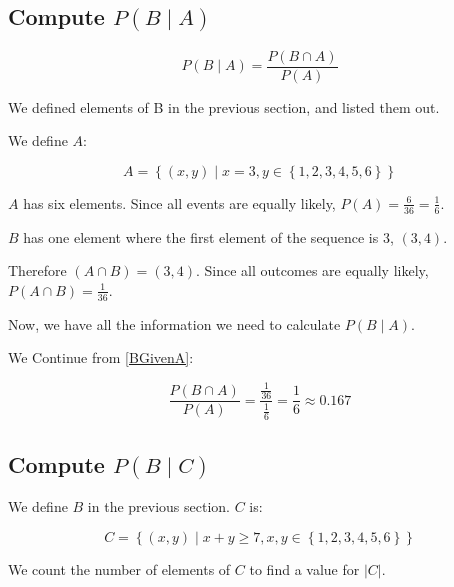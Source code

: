 \documentclass[a4paper,11pt]{article}
\begin{document}
\label{defs}
\subsection{Compute $P \left( B \mid A \right)$} 

\begin{equation}  
  P \left( B \mid A \right) =
  \frac {P \left( B \cap A \right) } { P \left( A \right) }
\end{equation}

We defined elements of B in the previous section, and listed them out.

We define $A$:

\begin{equation} \label{BGivenA}
  A = \left\{ \left(x, y \right) \mid x = 3, y \in 
    \left\{ 1, 2, 3, 4, 5, 6 \right\} \right\}
\end{equation}

$A$ has six elements. Since all events are equally likely, 
$P\left( A \right) = \frac{6}{36} = \frac{1}{6}$.

$B$ has one element where the first element of the sequence is $3$,
$\left(3, 4 \right)$.

Therefore $\left( A \cap B \right) = \left( 3,4 \right)$. Since
all outcomes are equally likely, $P\left( A \cap B \right) 
  = \frac{1}{36}$.

Now, we have all the information we need to calculate 
$P \left( B \mid A \right)$.

We Continue from \ref{BGivenA}:

\begin{equation}  
  \frac {P \left( B \cap A \right) } { P \left( A \right) } =
  \frac {\frac{1}{36}} {\frac{1}{6}} = \frac{1}{6} \approx 0.167
\end{equation}

\subsection{Compute $P\left( B \mid C \right)$}

We define $B$ in the previous section.  $C$ is:

\begin{equation}
  C = \left\{ \left( x, y \right) \mid x + y \geq 7, x,y \in{}
    \left\{ 1, 2, 3, 4, 5, 6 \right\} \right\}
\end{equation}

We count the number of elements of $C$ to find a value for 
$\left| C \right|$.
\end{document}
